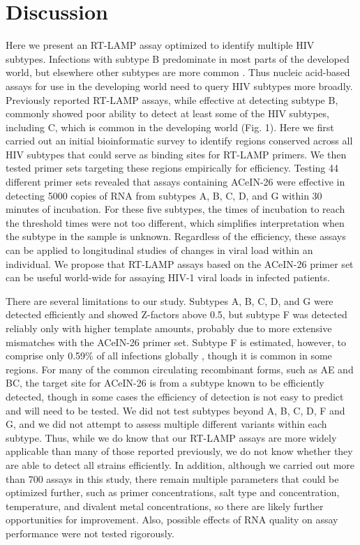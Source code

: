 \documentclass[../sherrill-Mix_thesis.tex]{subfiles}
\begin{document}
\section{Discussion}
	Here we present an RT-LAMP assay optimized to identify multiple HIV subtypes. Infections with subtype B predominate in most parts of the developed world, but elsewhere other subtypes are more common \citep{Buonaguro2007}. Thus nucleic acid-based assays for use in the developing world need to query HIV subtypes more broadly. Previously reported RT-LAMP assays, while effective at detecting subtype B, commonly showed poor ability to detect at least some of the HIV subtypes, including C, which is common in the developing world (Fig. 1). Here we first carried out an initial bioinformatic survey to identify regions conserved across all HIV subtypes that could serve as binding sites for RT-LAMP primers. We then tested primer sets targeting these regions empirically for efficiency. Testing 44 different primer sets revealed that assays containing ACeIN-26 were effective in detecting 5000 copies of RNA from subtypes A, B, C, D, and G within 30 minutes of incubation. For these five subtypes, the times of incubation to reach the threshold times were not too different, which simplifies interpretation when the subtype in the sample is unknown. Regardless of the efficiency, these assays can be applied to longitudinal studies of changes in viral load within an individual. We propose that RT-LAMP assays based on the ACeIN-26 primer set can be useful world-wide for assaying HIV-1 viral loads in infected patients.

	There are several limitations to our study. Subtypes A, B, C, D, and G were detected efficiently and showed Z-factors above 0.5, but subtype F was detected reliably only with higher template amounts, probably due to more extensive mismatches with the ACeIN-26 primer set. Subtype F is estimated, however, to comprise only 0.59\% of all infections globally \citep{Buonaguro2007}, though it is common in some regions. For many of the common circulating recombinant forms, such as AE and BC, the target site for ACeIN-26 is from a subtype known to be efficiently detected, though in some cases the efficiency of detection is not easy to predict and will need to be tested. We did not test subtypes beyond A, B, C, D, F and G, and we did not attempt to assess multiple different variants within each subtype. Thus, while we do know that our RT-LAMP assays are more widely applicable than many of those reported previously, we do not know whether they are able to detect all strains efficiently. In addition, although we carried out more than 700 assays in this study, there remain multiple parameters that could be optimized further, such as primer concentrations, salt type and concentration, temperature, and divalent metal concentrations, so there are likely further opportunities for improvement. Also, possible effects of RNA quality on assay performance were not tested rigorously.
\end{document}
